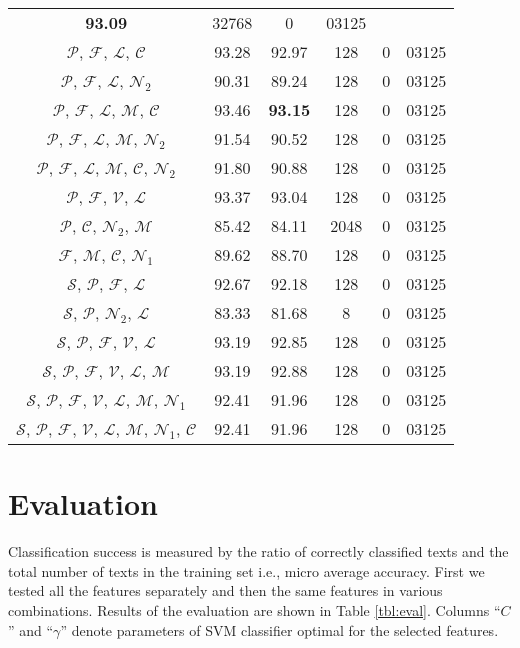 \documentclass{llncs}
\begin{document}
\begin{table*}[htb]
\begin{center}
\begin{tabular}{c c c c r@{.}l}
\textbf{93.09} & 32768 & 0 & 03125\\
$\mathcal{P}$, $\mathcal{F}$, $\mathcal{L}$, $\mathcal{C}$ & 93.28 & 92.97 &
128 & 0 & 03125\\
$\mathcal{P}$, $\mathcal{F}$, $\mathcal{L}$, $\mathcal{N}_2$ & 90.31 & 89.24 &
128 & 0 & 03125\\
$\mathcal{P}$, $\mathcal{F}$, $\mathcal{L}$, $\mathcal{M}$, $\mathcal{C}$ &
93.46 & \textbf{93.15} & 128 & 0 & 03125\\
$\mathcal{P}$, $\mathcal{F}$, $\mathcal{L}$, $\mathcal{M}$, $\mathcal{N}_2$ &
91.54 & 90.52 & 128 & 0 & 03125\\
$\mathcal{P}$, $\mathcal{F}$, $\mathcal{L}$, $\mathcal{M}$, $\mathcal{C}$,
$\mathcal{N}_2$ & 91.80 & 90.88 & 128 & 0 & 03125\\
$\mathcal{P}$, $\mathcal{F}$, $\mathcal{V}$, $\mathcal{L}$ & 93.37 & 93.04 &
128 & 0 & 03125\\
$\mathcal{P}$, $\mathcal{C}$, $\mathcal{N}_2$,  $\mathcal{M}$ & 85.42 & 84.11 &
2048 & 0 & 03125\\
$\mathcal{F}$, $\mathcal{M}$, $\mathcal{C}$, $\mathcal{N}_1$ & 89.62 & 88.70 & 128 & 0
& 03125\\
$\mathcal{S}$, $\mathcal{P}$, $\mathcal{F}$, $\mathcal{L}$ & 92.67 & 92.18 & 128 & 0 &
03125\\
$\mathcal{S}$, $\mathcal{P}$, $\mathcal{N}_2$, $\mathcal{L}$ & 83.33 & 81.68 & 8 & 0 &
03125\\
$\mathcal{S}$, $\mathcal{P}$, $\mathcal{F}$, $\mathcal{V}$, $\mathcal{L}$ &
93.19 & 92.85 & 128 & 0 & 03125\\
$\mathcal{S}$, $\mathcal{P}$, $\mathcal{F}$, $\mathcal{V}$, $\mathcal{L}$,
$\mathcal{M}$ & 93.19 & 92.88 & 128 & 0 & 03125\\
$\mathcal{S}$, $\mathcal{P}$, $\mathcal{F}$, $\mathcal{V}$,
$\mathcal{L}$, $\mathcal{M}$, $\mathcal{N}_1$ & 92.41 & 91.96 & 128 & 0 & 03125\\
$\mathcal{S}$, $\mathcal{P}$, $\mathcal{F}$, $\mathcal{V}$, $\mathcal{L}$,
$\mathcal{M}$, $\mathcal{N}_1$, $\mathcal{C}$ & 92.41 &
91.96 & 128 & 0 & 03125\\
\bottomrule
\end{tabular}
\label{tbl:eval}
\end{center}
\end{table*}

\section{Evaluation}
\label{sec:evaluacija}
Classification success is measured by the ratio of correctly classified texts and
the total number of texts in the training set i.e., micro average accuracy.
First we tested all the features separately and then the same features in
various combinations. Results of the evaluation
are shown in Table \ref{tbl:eval}. Columns ``$C$'' and ``$\gamma$'' denote
parameters of SVM classifier optimal for the selected features.
\end{document}
